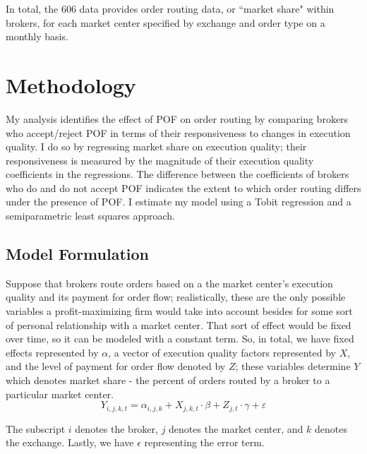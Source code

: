 \documentclass[12pt,a4paper]{article}
\begin{document}
		In total, the 606 data provides order routing data, or ``market share" within brokers, for each market center specified by exchange and order type on a monthly basis. 


	

\section{Methodology}

	My analysis identifies the effect of POF on order routing by comparing brokers who accept/reject POF in terms of their responsiveness to changes in execution quality. I do so by regressing market share on execution quality; their responsiveness is measured by the magnitude of their execution quality coefficients in the regressions. The difference between the coefficients of brokers who do and do not accept POF indicates the extent to which order routing differs under the presence of POF. I estimate my model using a Tobit regression and a semiparametric least squares approach. 

	\subsection{Model Formulation}

	Suppose that brokers route orders based on a the market center's execution quality and its payment for order flow; realistically, these are the only possible variables a profit-maximizing firm would take into account besides for some sort of personal relationship with a market center. That sort of effect would be fixed over time, so it can be modeled with a constant term. So, in total, we have fixed effects represented by $\alpha$, a vector of execution quality factors represented by $X$, and the level of payment for order flow denoted by $Z$; these variables determine $Y$ which denotes market share - the percent of orders routed by a broker to a particular market center. 
	\begin{equation}
	Y_{i, j, k, t} = \alpha_{i,j,k} +  X_{j, k, t} \cdot \beta +   Z_{j,  t} \cdot \gamma + \varepsilon
	\end{equation}	
	
	The subscript $i$ denotes the broker, $j$ denotes the market center, and $k$ denotes the exchange. Lastly, we have $\epsilon$ representing the error term.
	
\end{document}
